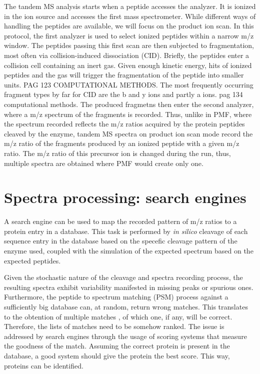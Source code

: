 \documentclass[11pt, a4paper]{report}
\begin{document}
The tandem MS analysis starts when a peptide accesses the analyzer. It is ionized in the ion source and accesses the first mass spectrometer. While different ways of handling the peptides are available, we will focus on the product ion scan. In this protocol, the first analyzer is used to select ionized peptides within a narrow m/z window. The peptides passing this first scan are then subjected to fragmentation, most often via collision-induced dissociation (CID). Briefly, the peptides enter a collision cell containing an inert gas. Given enough kinetic energy, hits of ionized peptides and the gas will trigger the fragmentation of the peptide into smaller units. PAG 123 COMPUTATIONAL METHODS. The most frequently occurring fragment types by far for CID are the b and y ions and partly a ions. pag 134 computational methods. The produced fragmetns then enter the second analyzer, where a m/z spectrum of the fragments is recorded. Thus, unlike in PMF, where the spectrum recorded reflects the m/z ratios acquired by the protein peptides cleaved by the enzyme, tandem MS spectra on product ion scan mode record the m/z ratio of the fragments produced by an ionized peptide with a given m/z ratio. The m/z ratio of this precursor ion is changed during the run, thus, multiple spectra are obtained where PMF would create only one.


\section{Spectra processing: search engines}

A search engine can be used to map the recorded pattern of m/z ratios to a protein entry in a database. This task is performed by \textit{in silico} cleavage of each sequence entry in the database based on the specefic cleavage pattern of the enzyme used, coupled with the simulation of the expected spectrum based on the expected peptides.

Given the stochastic nature of the cleavage and spectra recording process, the resulting spectra exhibit variability manifested in missing peaks or spurious ones. Furthermore, the peptide to spectrum matching (PSM) process against a sufficiently big database can, at random, return wrong matches. This translates to the obtention of multiple matches , of which one, if any, will be correct. Therefore, the lists of matches need to be somehow ranked. The issue is addressed by search engines through the usage of scoring systems that measure the goodness of the match. Assuming the correct protein is present in the database, a good system should give the protein the best score. This way, proteins can be identified.
\end{document}
